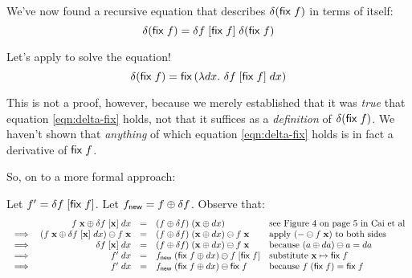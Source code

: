 \documentclass{article}
\begin{document}
We've now found a recursive equation that describes
$\delta(\mathsf{fix}\;f)$ in terms of itself:
\begin{equation}\label{eqn:delta-fix}
  \delta(\mathsf{fix}\;f) = \delta f \;[{\mathsf{fix}\; f}] \; \delta(\mathsf{fix}\;f)
\end{equation}

Let's apply  to solve the equation!
\begin{equation}
  \delta(\mathsf{fix}\; f)
  = \mathsf{fix}\,(\lambda dx.\,\, \delta f \;[{\mathsf{fix}\;f}] \;dx)
\end{equation}

This is not a proof, however, because we merely established that it was
\emph{true} that equation \ref{eqn:delta-fix} holds, not that it suffices as a
\emph{definition} of $\delta(\mathsf{fix}\;f)$. We haven't shown that
\emph{anything} of which equation \ref{eqn:delta-fix} holds is in fact a
derivative of $\mathsf{fix}\;f$. 

So, on to a more formal approach:

Let $f' = \delta{f} \;[{\mathsf{fix}\; f}]$.
Let $f_{\mathsf{new}} = f \oplus \delta f$.
Observe that:
\[\begin{array}{rrcll}
  &   f\;\mathbf{x} \oplus \delta f \;[{\mathbf{x}}] \;dx
  &=& (f \oplus \delta f) \; (\mathbf{x} \oplus dx)
  & \text{see Figure 4 on page 5 in Cai et al}
  \\ \implies&
  (f\;\mathbf{x} \oplus \delta f \; [{\mathbf{x}}] \; dx) \ominus f\;\mathbf{x}
  &=&
  (f \oplus \delta f) \; (\mathbf{x} \oplus dx) \ominus f\;\mathbf{x}
  & \text{apply $(- \ominus f\;\mathbf{x})$ to both sides}
  \\ \implies&
  \delta f \; [{\mathbf{x}}] \; dx
  &=&
  (f \oplus \delta f) \; (\mathbf{x} \oplus dx) \ominus f\;\mathbf{x}
  & \text{because}~(a \oplus da) \ominus a = da
  \\ \implies&
  f' \; dx
  &=& f_{\mathsf{new}} \; (\mathsf{fix}\;f \oplus dx)
      \ominus f\; [{\mathsf{fix}\; f}]
  & \text{substitute $\mathbf{x} \mapsto \mathsf{fix}\;f$}
  \\ \implies&
  f' \; dx
  &=& f_{\mathsf{new}} \; (\mathsf{fix}\;f \oplus dx)
      \ominus \mathsf{fix}\; f
  & \text{because}~f\;(\mathsf{fix}\;f) = \mathsf{fix}\;f
\end{array}\]
\end{document}
